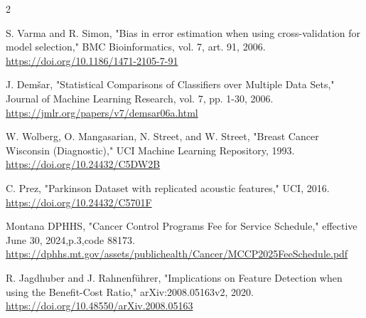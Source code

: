 \documentclass[10pt,a4paper]{article}
\begin{document}
\begin{multicols}{2}
\begin{minipage}{\linewidth}{\fontsize{7}{8.2}\selectfont [13] S. Varma and R. Simon, "Bias in error estimation when using cross-validation for model selection," BMC Bioinformatics, vol. 7, art. 91, 2006. \url{https://doi.org/10.1186/1471-2105-7-91}\par}\end{minipage}\par
\begin{minipage}{\linewidth}{\fontsize{7}{8.2}\selectfont [14] J. Demšar, "Statistical Comparisons of Classifiers over Multiple Data Sets," Journal of Machine Learning Research, vol. 7, pp. 1-30, 2006. \url{https://jmlr.org/papers/v7/demsar06a.html}\par}\end{minipage}\par
\begin{minipage}{\linewidth}{\fontsize{7}{8.2}\selectfont [15] W. Wolberg, O. Mangasarian, N. Street, and W. Street, "Breast Cancer Wisconsin (Diagnostic)," UCI Machine Learning Repository, 1993. \url{https://doi.org/10.24432/C5DW2B}\par}\end{minipage}\par
\begin{minipage}{\linewidth}{\fontsize{7}{8.2}\selectfont [16] C. Prez, "Parkinson Dataset with replicated acoustic features," UCI, 2016. \url{https://doi.org/10.24432/C5701F}\par}\end{minipage}\par
\begin{minipage}{\linewidth}{\fontsize{7}{8.2}\selectfont [17] Montana DPHHS, "Cancer Control Programs Fee for Service Schedule," effective June 30, 2024,p.3,code 88173. \url{https://dphhs.mt.gov/assets/publichealth/Cancer/MCCP2025FeeSchedule.pdf}\par}\end{minipage}\par
\begin{minipage}{\linewidth}{\fontsize{7}{8.2}\selectfont [18] R. Jagdhuber and J. Rahnenführer, "Implications on Feature Detection when using the Benefit-Cost Ratio," arXiv:2008.05163v2, 2020. \url{https://doi.org/10.48550/arXiv.2008.05163}\par}\end{minipage}\par
\end{multicols}
\end{document}

